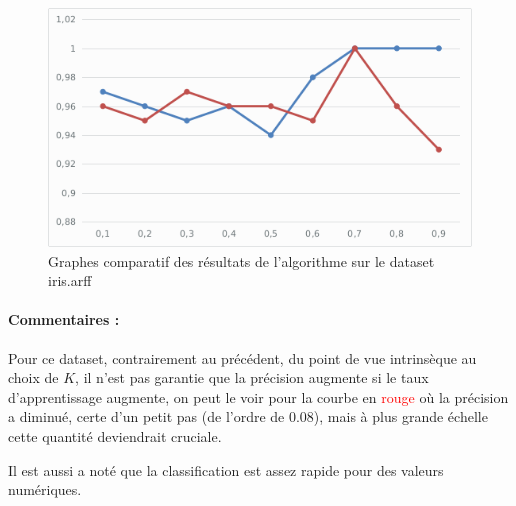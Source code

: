 		\begin{figure}[H]
			\centering
			\includegraphics[width=0.75\linewidth]{knn/images/graph_iris.png}
			\caption{Graphes comparatif des résultats de l'algorithme sur le dataset iris.arff}
		\end{figure}
		\paragraph{Commentaires : }
		Pour ce dataset, contrairement au précédent, du point de vue intrinsèque au choix de $K$, il n'est pas garantie que la précision augmente si le taux d'apprentissage augmente, on peut le voir pour la courbe en \textcolor{red}{rouge} où la précision a diminué, certe d'un petit pas (de l'ordre de 0.08), mais à plus grande échelle cette quantité deviendrait cruciale. 
		\par Il est aussi a noté que la classification est assez rapide pour des valeurs numériques.
		
